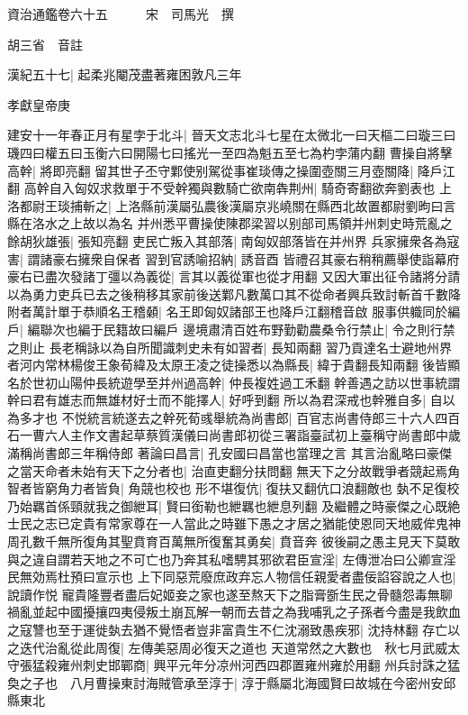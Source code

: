 資治通鑑卷六十五　　　宋　司馬光　撰

胡三省　音註

漢紀五十七|{
	起柔兆閹茂盡著雍困敦凡三年}


孝獻皇帝庚

建安十一年春正月有星孛于北斗|{
	晉天文志北斗七星在太微北一曰天樞二曰璇三曰璣四曰權五曰玉衡六曰開陽七曰搖光一至四為魁五至七為杓孛蒲内翻}
曹操自將擊高幹|{
	將即亮翻}
留其世子丕守鄴使别駕從事崔琰傳之操圍壺關三月壺關降|{
	降戶江翻}
高幹自入匈奴求救單于不受幹獨與數騎亡欲南犇荆州|{
	騎奇寄翻欲奔劉表也}
上洛都尉王琰捕斬之|{
	上洛縣前漢屬弘農後漢屬京兆嶢關在縣西北故置都尉劉昫曰言縣在洛水之上故以為名}
并州悉平曹操使陳郡梁習以别部司馬領并州刺史時荒亂之餘胡狄雄張|{
	張知亮翻}
吏民亡叛入其部落|{
	南匈奴部落皆在并州界}
兵家擁衆各為寇害|{
	謂諸豪右擁衆自保者}
習到官誘喻招納|{
	誘音酉}
皆禮召其豪右稍稍薦舉使詣幕府豪右已盡次發諸丁彊以為義從|{
	言其以義從軍也從才用翻}
又因大軍出征令諸將分請以為勇力吏兵已去之後稍移其家前後送鄴凡數萬口其不從命者興兵致討斬首千數降附者萬計單于恭順名王稽顙|{
	名王即匈奴諸部王也降戶江翻稽音啟}
服事供軄同於編戶|{
	編聯次也編于民籍故曰編戶}
邊境肅清百姓布野勤勸農桑令行禁止|{
	令之則行禁之則止}
長老稱詠以為自所聞識刺史未有如習者|{
	長知兩翻}
習乃貢達名士避地州界者河内常林楊俊王象荀緯及太原王凌之徒操悉以為縣長|{
	緯于貴翻長知兩翻}
後皆顯名於世初山陽仲長統遊學至并州過高幹|{
	仲長複姓過工禾翻}
幹善遇之訪以世事統謂幹曰君有雄志而無雄材好士而不能擇人|{
	好呼到翻}
所以為君深戒也幹雅自多|{
	自以為多才也}
不悦統言統遂去之幹死荀彧舉統為尚書郎|{
	百官志尚書侍郎三十六人四百石一曹六人主作文書起草蔡質漢儀曰尚書郎初從三署詣臺試初上臺稱守尚書郎中歲滿稱尚書郎三年稱侍郎}
著論曰昌言|{
	孔安國曰昌當也當理之言}
其言治亂略曰豪傑之當天命者未始有天下之分者也|{
	治直吏翻分扶問翻}
無天下之分故戰爭者競起焉角智者皆窮角力者皆負|{
	角競也校也}
形不堪復伉|{
	復扶又翻伉口浪翻敵也}
埶不足復校乃始羈首係頸就我之御紲耳|{
	賢曰銜勒也紲羈也紲息列翻}
及繼體之時豪傑之心既絶士民之志已定貴有常家尊在一人當此之時雖下愚之才居之猶能使恩同天地威侔鬼神周孔數千無所復角其聖賁育百萬無所復奮其勇矣|{
	賁音奔}
彼後嗣之愚主見天下莫敢與之違自謂若天地之不可亡也乃奔其私嗜騁其邪欲君臣宣淫|{
	左傳泄冶曰公卿宣淫民無効焉杜預曰宣示也}
上下同惡荒廢庶政弃忘人物信任親愛者盡佞諂容說之人也|{
	說讀作悦}
寵貴隆豐者盡后妃姬妾之家也遂至熬天下之脂膏斵生民之骨髓怨毒無聊禍亂並起中國擾攘四夷侵叛土崩瓦解一朝而去昔之為我哺乳之子孫者今盡是我飲血之寇讐也至于運徙埶去猶不覺悟者豈非富貴生不仁沈溺致愚疾邪|{
	沈持林翻}
存亡以之迭代治亂從此周復|{
	左傳美惡周必復天之道也}
天道常然之大數也　秋七月武威太守張猛殺雍州刺史邯鄲商|{
	興平元年分凉州河西四郡置雍州雍於用翻}
州兵討誅之猛奐之子也　八月曹操東討海賊管承至淳于|{
	淳于縣屬北海國賢曰故城在今密州安邱縣東北}
